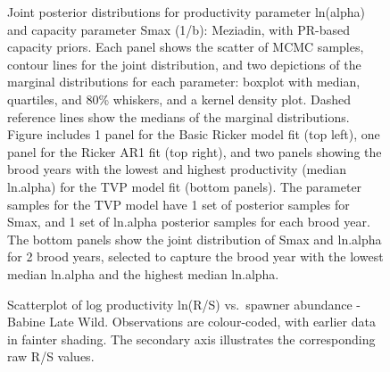 \documentclass[french,11pt]{book}
\begin{document}
\begin{figure}[htb]

{\centering {} 

}

\caption{Joint posterior distributions for productivity parameter ln(alpha) and capacity parameter Smax (1/b): Meziadin, with PR-based capacity priors. Each panel shows the scatter of MCMC samples, contour lines for the joint distribution, and two depictions of the marginal distributions for each parameter: boxplot with median, quartiles, and 80\% whiskers, and a kernel density plot. Dashed reference lines show the medians of the marginal distributions. Figure includes 1 panel for the Basic Ricker model fit (top left), one panel for the Ricker AR1 fit (top right), and two panels showing the brood years with the lowest and highest productivity (median ln.alpha) for the TVP model fit (bottom panels). The parameter samples for the TVP model have 1 set of posterior samples for Smax, and 1 set of ln.alpha posterior samples for each brood year. The bottom panels show the joint distribution of Smax and ln.alpha for 2 brood years, selected to capture the brood year with the lowest median ln.alpha and the highest median ln.alpha.}\label{fig:JoinPostMezidian}
\end{figure}

\begin{figure}[htb]

{\centering {} 

}

\caption{Scatterplot of log productivity ln(R/S) vs.~spawner abundance - Babine Late Wild. Observations are colour-coded, with earlier data in fainter shading. The secondary axis illustrates the corresponding raw R/S values.}\label{fig:ScatterBabLW}
\end{figure}
\end{document}
